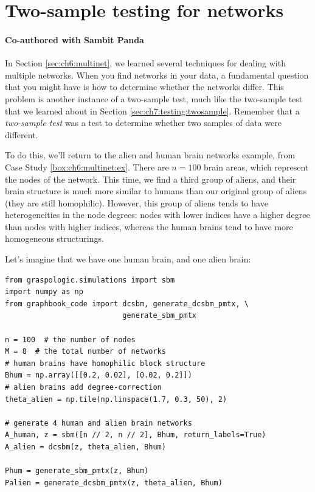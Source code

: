 \section{Two-sample testing for networks}
\paragraph*{Co-authored with Sambit Panda}
\label{sec:ch8:twosample}

In Section \ref{sec:ch6:multinet}, we learned several techniques for dealing with multiple networks. When you find networks in your data, a fundamental question that you might have is how to determine whether the networks differ. This problem is another instance of a two-sample test, much like the two-sample test that we learned about in Section \ref{sec:ch7:testing:twosample}. Remember that a \textit{two-sample test} was a test to determine whether two samples of data were different. 

To do this, we'll return to the alien and human brain networks example, from Case Study \ref{box:ch6:multinet:ex}. There are $n=100$ brain areas, which represent the nodes of the network. This time, we find a third group of aliens, and their brain structure is much more similar to humans than our original group of aliens (they are still homophilic). However, this group of aliens tends to have heterogeneities in the node degrees: nodes with lower indices have a higher degree than nodes with higher indices, whereas the human brains tend to have more homogeneous structurings.

Let's imagine that we have one human brain, and one alien brain:

\begin{lstlisting}[style=python]
from graspologic.simulations import sbm
import numpy as np
from graphbook_code import dcsbm, generate_dcsbm_pmtx, \
                           generate_sbm_pmtx

n = 100  # the number of nodes
M = 8  # the total number of networks
# human brains have homophilic block structure
Bhum = np.array([[0.2, 0.02], [0.02, 0.2]])
# alien brains add degree-correction
theta_alien = np.tile(np.linspace(1.7, 0.3, 50), 2)

# generate 4 human and alien brain networks
A_human, z = sbm([n // 2, n // 2], Bhum, return_labels=True)
A_alien = dcsbm(z, theta_alien, Bhum)

Phum = generate_sbm_pmtx(z, Bhum)
Palien = generate_dcsbm_pmtx(z, theta_alien, Bhum)
\end{lstlisting}

